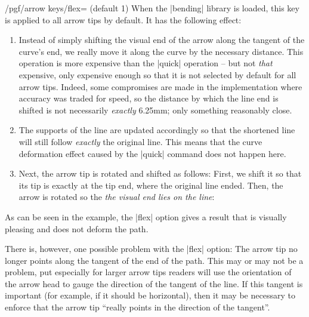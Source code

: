 \begin{key}{/pgf/arrow keys/flex= (default 1)}
    When the |bending| library is loaded, this key is applied to all arrow tips
    by default. It has the following effect:
    \begin{enumerate}
        \item Instead of simply shifting the visual end of the arrow along
            the tangent of the curve's end, we really move it along the curve
            by the necessary distance. This operation is more expensive than
            the |quick| operation -- but not \emph{that} expensive, only
            expensive enough so that it is not selected by default for all
            arrow tips. Indeed, some compromises are made in the
            implementation where accuracy was traded for speed, so the
            distance by which the line end is shifted is not necessarily
            \emph{exactly} 6.25mm; only something reasonably close.
        \item The supports of the line are updated accordingly so that the
            shortened line will still follow \emph{exactly} the original
            line. This means that the curve deformation effect caused by the
            |quick| command does not happen here.
        \item Next, the arrow tip is rotated and shifted as follows: First,
            we shift it so that its tip is exactly at the tip end, where the
            original line ended. Then, the arrow is rotated so the \emph{the
            visual end lies on the line}:
\begin{codeexample}[preamble={\usetikzlibrary{arrows.meta,bending}}]
\end{codeexample}
    \end{enumerate}

    As can be seen in the example, the |flex| option gives a result that is
    visually pleasing and does not deform the path.

    There is, however, one possible problem with the |flex| option: The arrow
    tip no longer points along the tangent of the end of the path. This may or
    may not be a problem, put especially for larger arrow tips readers will use
    the orientation of the arrow head to gauge the direction of the tangent of
    the line. If this tangent is important (for example, if it should be
    horizontal), then it may be necessary to enforce that the arrow tip
    ``really points in the direction of the tangent''.


\end{key}
